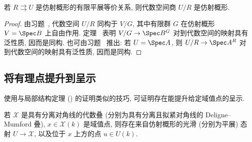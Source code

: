 \begin{proposition}\label{src:5.3.3}
若 $R\rightrightarrows U$ 是仿射概形的有限平展等价关系, 则代数空间商 $U/R$ 是仿射概形.
\end{proposition}
\begin{proof}
由习题~, 代数空间 $U/R$ 同构于 $V/G$, 其中有限群 $G$ 在仿射概形 $V=\Spec B$ 上自由作用. 定理~ 表明 $V/G\to\Spec B^G$ 对到代数空间的映射具有泛性质, 因而是同构. 也可由习题~ 推出: 若 $U=\Spec A$, 则 $U/R\to\Spec A^R$ 对到代数空间的映射具有泛性质, 因而是同构.
\end{proof}

\subsection{将有理点提升到呈示}\label{src:5.3.2-subsection}
使用与局部结构定理 () 的证明类似的技巧, 可证明存在能提升给定域值点的呈示.
\begin{proposition}\label{src:5.3.4}
若 $\mathcal X$ 是具有分离对角线的代数叠 (分别为具有分离且拟紧对角线的 Deligne--Mumford 叠), $x\in\mathcal X(k)$ 是域值点, 则存在来自仿射概形的光滑 (分别为平展) 态射 $U\to\mathcal X$, 以及位于 $x$ 上方的点 $u\in U(k)$.
\end{proposition}
